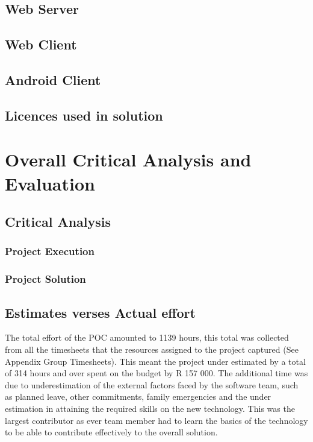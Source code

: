 \documentclass[12pt]{witseiepaper}
\begin{document}
\subsection{Web Server}


\subsection{Web Client}

\subsection{Android Client}

\subsection{Licences used in solution}
 

\section{Overall Critical Analysis and Evaluation}

\subsection{Critical Analysis}

\subsubsection{Project Execution}


%  

\subsubsection{Project Solution}




\subsection{Estimates verses Actual effort}
The total effort of the POC amounted to 1139 hours, this total was collected from all the timesheets that the resources assigned to the project captured (See Appendix Group Timesheets). This meant the project under estimated by a total of 314 hours and over spent on the budget by R 157 000.  The additional time was due to underestimation of the external factors faced by the software team, such as planned leave, other commitments, family emergencies and the under estimation in attaining the required skills on the new technology. This was the largest contributor as ever team member had to learn the basics of the technology to be able to contribute effectively to the overall solution.
\end{document}

